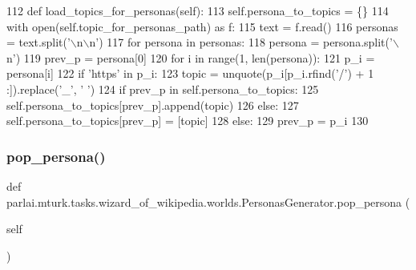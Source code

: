 \begin{DoxyCode}
112     \textcolor{keyword}{def }load\_topics\_for\_personas(self):
113         self.persona\_to\_topics = \{\}
114         with open(self.topic\_for\_personas\_path) \textcolor{keyword}{as} f:
115             text = f.read()
116             personas = text.split(\textcolor{stringliteral}{'\(\backslash\)n\(\backslash\)n'})
117             \textcolor{keywordflow}{for} persona \textcolor{keywordflow}{in} personas:
118                 persona = persona.split(\textcolor{stringliteral}{'\(\backslash\)n'})
119                 prev\_p = persona[0]
120                 \textcolor{keywordflow}{for} i \textcolor{keywordflow}{in} range(1, len(persona)):
121                     p\_i = persona[i]
122                     \textcolor{keywordflow}{if} \textcolor{stringliteral}{'https'} \textcolor{keywordflow}{in} p\_i:
123                         topic = unquote(p\_i[p\_i.rfind(\textcolor{stringliteral}{'/'}) + 1 :]).replace(\textcolor{stringliteral}{'\_'}, \textcolor{stringliteral}{' '})
124                         \textcolor{keywordflow}{if} prev\_p \textcolor{keywordflow}{in} self.persona\_to\_topics:
125                             self.persona\_to\_topics[prev\_p].append(topic)
126                         \textcolor{keywordflow}{else}:
127                             self.persona\_to\_topics[prev\_p] = [topic]
128                     \textcolor{keywordflow}{else}:
129                         prev\_p = p\_i
130 
\end{DoxyCode}
\mbox{\label{classparlai_1_1mturk_1_1tasks_1_1wizard__of__wikipedia_1_1worlds_1_1PersonasGenerator_a587c095d1aa21abacac238160ead6dd0}} 
\subsubsection{\texorpdfstring{pop\+\_\+persona()}{pop\_persona()}}
{\footnotesize\ttfamily def parlai.\+mturk.\+tasks.\+wizard\+\_\+of\+\_\+wikipedia.\+worlds.\+Personas\+Generator.\+pop\+\_\+persona (\begin{DoxyParamCaption}\item[{}]{self }\end{DoxyParamCaption})}



